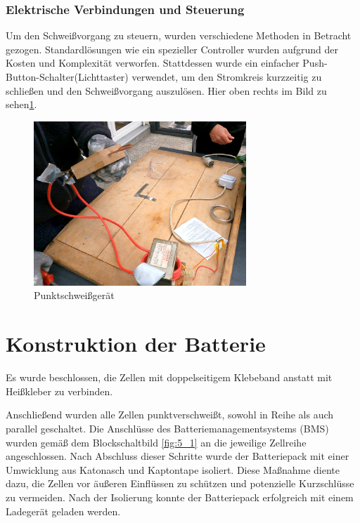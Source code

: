 \subsubsection*{Elektrische Verbindungen und Steuerung}
Um den Schweißvorgang zu steuern, wurden verschiedene Methoden in Betracht gezogen.
Standardlösungen wie ein spezieller Controller wurden aufgrund der Kosten und Komplexität verworfen.
Stattdessen wurde ein einfacher Push-Button-Schalter(Lichttaster) verwendet, um den Stromkreis kurzzeitig zu schließen und den Schweißvorgang auszulösen.
Hier oben rechts im Bild zu sehen\ref{fig:22}.


\begin{figure}[ht]
    \centering
    \includegraphics[width=8cm]{images/Transformator und Punktschweißgerät}
    \caption{ Punktschweißgerät\cite{lorenz_scherrer_selbst_2023}}
    \label{fig:22}
\end{figure}












\section{Konstruktion der Batterie}

Es wurde beschlossen, die Zellen mit doppelseitigem Klebeband anstatt mit Heißkleber zu verbinden.


Anschließend wurden alle Zellen punktverschweißt, sowohl in Reihe als auch parallel geschaltet.
Die Anschlüsse des Batteriemanagementsystems (BMS) wurden gemäß dem Blockschaltbild \ref{fig:5_1} an die jeweilige Zellreihe angeschlossen.
Nach Abschluss dieser Schritte wurde der Batteriepack mit einer Umwicklung aus Katonasch und Kaptontape isoliert.
Diese Maßnahme diente dazu, die Zellen vor äußeren Einflüssen zu schützen und potenzielle Kurzschlüsse zu vermeiden.
Nach der Isolierung konnte der Batteriepack erfolgreich mit einem Ladegerät geladen werden.

